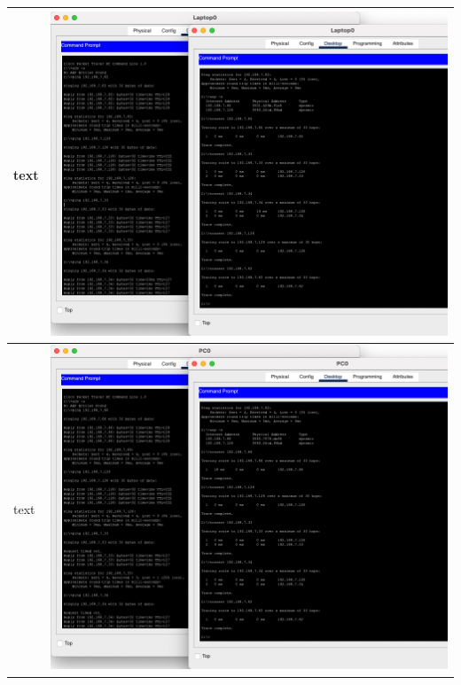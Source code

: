 \documentclass[11pt,a4paper]{report}
\begin{document}
\begin{flushleft}
\begin{center}
\begin{longtable}{ m{5cm} l }
                        text & \includegraphics[scale=0.34,valign=c]{phase2/images/p2-connecting2lanswithrouter/Laptop0_cmdall} \\ \hline
                        text & \includegraphics[scale=0.34,valign=c]{phase2/images/p2-connecting2lanswithrouter/PC0_cmdall} \\ \hline

\end{longtable}
\end{center}
\end{flushleft}
\end{document}

